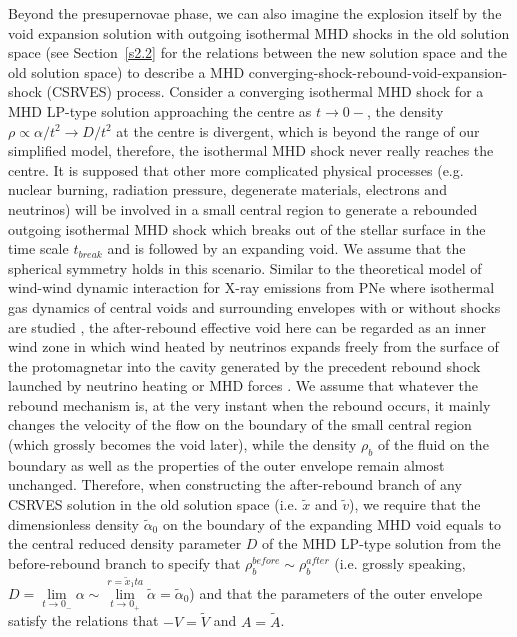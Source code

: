 \documentclass[fleqn,usenatbib]{mnras}
\begin{document}
Beyond the presupernovae phase, we can also imagine the explosion itself by the void expansion solution with outgoing isothermal MHD shocks in the old solution space (see Section~\ref{s2.2} for the relations between the new solution space and the old solution space) to describe a MHD converging-shock-rebound-void-expansion-shock (CSRVES) process. Consider a converging isothermal MHD shock for a MHD LP-type solution approaching the centre as $t\rightarrow 0{-}$, the density $\rho\propto \alpha/t^{2}\rightarrow D/t^{2}$ at the centre is divergent, which is beyond the range of our simplified model, therefore, the isothermal MHD shock never really reaches the centre. It is supposed that other more complicated physical processes (e.g. nuclear burning, radiation pressure, degenerate materials, electrons and neutrinos) will be involved in a small central region to generate a rebounded outgoing isothermal MHD shock which breaks out of the stellar surface in the time scale $t_{break}$ and is followed by an expanding void. We assume that the spherical symmetry holds in this scenario. Similar to the theoretical model of wind-wind dynamic interaction for X-ray emissions from PNe where isothermal gas dynamics of central voids and surrounding envelopes with or without shocks are studied \citep{lou2009dynamic}, the after-rebound effective void here can be regarded as an inner wind zone in which wind heated by neutrinos expands freely from the surface of the protomagnetar into the cavity generated by the precedent rebound shock launched by neutrino heating or MHD forces \citep{Metzger2011}. We assume that whatever the rebound mechanism is, at the very instant when the rebound occurs, it mainly changes the velocity of the flow on the boundary of the small central region (which grossly becomes the void later), while the density $\rho_{b}$ of the fluid on the boundary as well as the properties of the outer envelope remain almost unchanged. Therefore, when constructing the after-rebound branch of any CSRVES solution in the old solution space (i.e. $\widetilde{x}$ and $\widetilde{v}$), we require that the dimensionless density $\widetilde{\alpha}_{0}$ on the boundary of the expanding MHD void equals to the central reduced density parameter $D$ of the MHD LP-type solution from the before-rebound branch to specify that $\rho_{b}^{before}\sim\rho_{b}^{after}$ (i.e. grossly speaking, $D=\lim\limits_{t\rightarrow 0_{-}}\alpha\sim \lim\limits_{t\rightarrow 0_{+}}^{r=\widetilde{x}_{1}ta}\widetilde{\alpha}=\widetilde{\alpha}_{0}$) and that the parameters of the outer envelope satisfy the relations that $-V=\widetilde{V}$ and $A=\widetilde{A}$.
\end{document}
